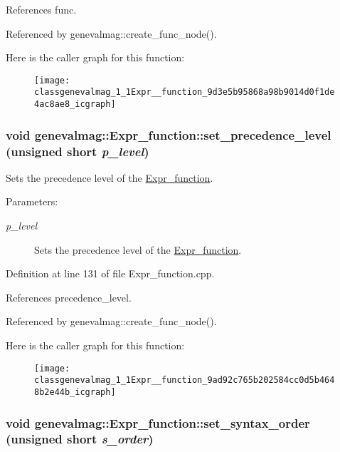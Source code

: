 References func.

Referenced by genevalmag::create\_\-func\_\-node().

Here is the caller graph for this function:\nopagebreak
\begin{figure}[H]
\begin{center}
\leavevmode
\texttt{[image: classgenevalmag\_1\_1Expr\_\_function\_9d3e5b95868a98b9014d0f1de4ac8ae8\_icgraph]}
\end{center}
\end{figure}
\hypertarget{classgenevalmag_1_1Expr__function_9ad92c765b202584cc0d5b4648b2e44b}{
\subsubsection[{set\_\-precedence\_\-level}]{\setlength{\rightskip}{0pt plus 5cm}void genevalmag::Expr\_\-function::set\_\-precedence\_\-level (unsigned short {\em p\_\-level})}}
\label{classgenevalmag_1_1Expr__function_9ad92c765b202584cc0d5b4648b2e44b}


Sets the precedence level of the \hyperlink{classgenevalmag_1_1Expr__function}{Expr\_\-function}. \begin{Desc}
\item[Parameters:]
\begin{description}
\item[{\em p\_\-level}]Sets the precedence level of the \hyperlink{classgenevalmag_1_1Expr__function}{Expr\_\-function}. \end{description}
\end{Desc}


Definition at line 131 of file Expr\_\-function.cpp.

References precedence\_\-level.

Referenced by genevalmag::create\_\-func\_\-node().

Here is the caller graph for this function:\nopagebreak
\begin{figure}[H]
\begin{center}
\leavevmode
\texttt{[image: classgenevalmag\_1\_1Expr\_\_function\_9ad92c765b202584cc0d5b4648b2e44b\_icgraph]}
\end{center}
\end{figure}
\hypertarget{classgenevalmag_1_1Expr__function_4d7c89c116c5f5f081f3527aa76b5e97}{
\subsubsection[{set\_\-syntax\_\-order}]{\setlength{\rightskip}{0pt plus 5cm}void genevalmag::Expr\_\-function::set\_\-syntax\_\-order (unsigned short {\em s\_\-order})}}
\label{classgenevalmag_1_1Expr__function_4d7c89c116c5f5f081f3527aa76b5e97}


